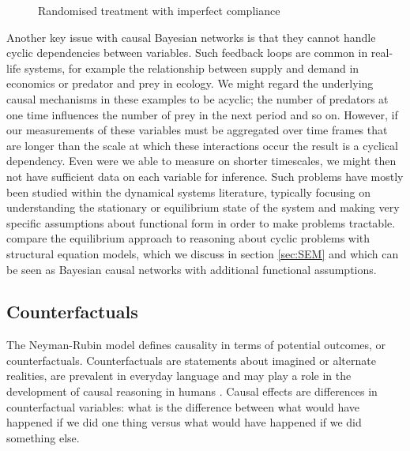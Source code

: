 \documentclass[11pt,a4paper,oneside]{book}
\theoremstyle{plain}
\theoremstyle{definition}
\begin{document}
\begin{figure}[h]
\centering
{}
\caption{Randomised treatment with imperfect compliance}
\label{fig:randomized_imperfect_compliance}
\end{figure}

Another key issue with causal Bayesian networks is that they cannot handle cyclic dependencies between variables. Such feedback loops are common in real-life systems, for example the relationship between supply and demand in economics or predator and prey in ecology. We might regard the underlying causal mechanisms in these examples to be acyclic; the number of predators at one time influences the number of prey in the next period and so on. However, if our measurements of these variables must be aggregated over time frames that are longer than the scale at which these interactions occur the result is a cyclical dependency. Even were we able to measure on shorter timescales, we might then not have sufficient data on each variable for inference. Such problems have mostly been studied within the dynamical systems literature, typically focusing on understanding the stationary or equilibrium state of the system and making very specific assumptions about functional form in order to make problems tractable. \citet{Poole2013} compare the equilibrium approach to reasoning about cyclic problems with structural equation models, which we discuss in section \ref{sec:SEM} and which can be seen as Bayesian causal networks with additional functional assumptions. 

\subsection{Counterfactuals}
\label{sec:counterfactuals}

The Neyman-Rubin model \citep{Rubin1974,Rubin1978,Rosenbaum1983, Rubin2005,Rubin2008} defines causality in terms of potential outcomes, or counterfactuals. Counterfactuals are statements about imagined or alternate realities, are prevalent in everyday language and may play a role in the development of causal reasoning in humans \citep{Weisberg2013}. Causal effects are differences in counterfactual variables: what is the difference between what would have happened if we did one thing versus what would have happened if we did something else. 
\end{document}
